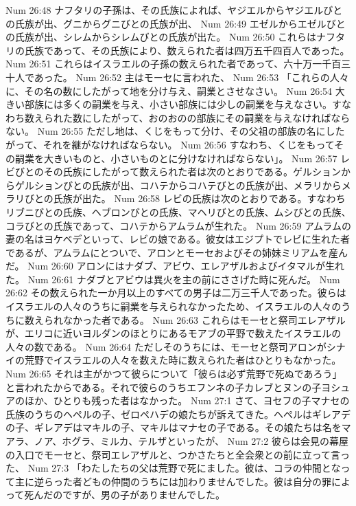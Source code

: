 Num 26:48  ナフタリの子孫は、その氏族によれば、ヤジエルからヤジエルびとの氏族が出、グニからグニびとの氏族が出、
Num 26:49  エゼルからエゼルびとの氏族が出、シレムからシレムびとの氏族が出た。
Num 26:50  これらはナフタリの氏族であって、その氏族により、数えられた者は四万五千四百人であった。
Num 26:51  これらはイスラエルの子孫の数えられた者であって、六十万一千百三十人であった。
Num 26:52  主はモーセに言われた、
Num 26:53  「これらの人々に、その名の数にしたがって地を分け与え、嗣業とさせなさい。
Num 26:54  大きい部族には多くの嗣業を与え、小さい部族には少しの嗣業を与えなさい。すなわち数えられた数にしたがって、おのおのの部族にその嗣業を与えなければならない。
Num 26:55  ただし地は、くじをもって分け、その父祖の部族の名にしたがって、それを継がなければならない。
Num 26:56  すなわち、くじをもってその嗣業を大きいものと、小さいものとに分けなければならない」。
Num 26:57  レビびとのその氏族にしたがって数えられた者は次のとおりである。ゲルションからゲルションびとの氏族が出、コハテからコハテびとの氏族が出、メラリからメラリびとの氏族が出た。
Num 26:58  レビの氏族は次のとおりである。すなわちリブニびとの氏族、ヘブロンびとの氏族、マヘリびとの氏族、ムシびとの氏族、コラびとの氏族であって、コハテからアムラムが生れた。
Num 26:59  アムラムの妻の名はヨケベデといって、レビの娘である。彼女はエジプトでレビに生れた者であるが、アムラムにとついで、アロンとモーセおよびその姉妹ミリアムを産んだ。
Num 26:60  アロンにはナダブ、アビウ、エレアザルおよびイタマルが生れた。
Num 26:61  ナダブとアビウは異火を主の前にささげた時に死んだ。
Num 26:62  その数えられた一か月以上のすべての男子は二万三千人であった。彼らはイスラエルの人々のうちに嗣業を与えられなかったため、イスラエルの人々のうちに数えられなかった者である。
Num 26:63  これらはモーセと祭司エレアザルが、エリコに近いヨルダンのほとりにあるモアブの平野で数えたイスラエルの人々の数である。
Num 26:64  ただしそのうちには、モーセと祭司アロンがシナイの荒野でイスラエルの人々を数えた時に数えられた者はひとりもなかった。
Num 26:65  それは主がかつて彼らについて「彼らは必ず荒野で死ぬであろう」と言われたからである。それで彼らのうちエフンネの子カレブとヌンの子ヨシュアのほか、ひとりも残った者はなかった。
Num 27:1  さて、ヨセフの子マナセの氏族のうちのヘペルの子、ゼロペハデの娘たちが訴えてきた。ヘペルはギレアデの子、ギレアデはマキルの子、マキルはマナセの子である。その娘たちは名をマアラ、ノア、ホグラ、ミルカ、テルザといったが、
Num 27:2  彼らは会見の幕屋の入口でモーセと、祭司エレアザルと、つかさたちと全会衆との前に立って言った、
Num 27:3  「わたしたちの父は荒野で死にました。彼は、コラの仲間となって主に逆らった者どもの仲間のうちには加わりませんでした。彼は自分の罪によって死んだのですが、男の子がありませんでした。
